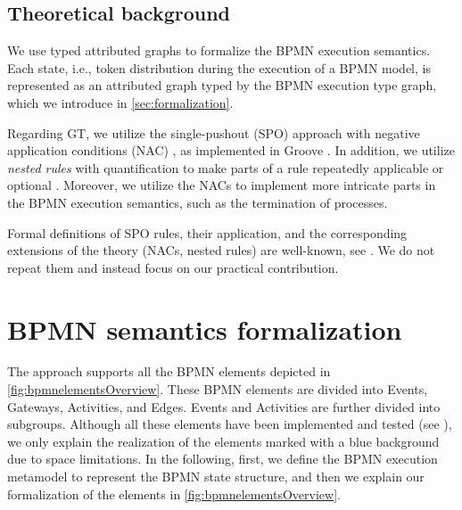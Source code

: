 \documentclass{lmcs} %
\begin{document}
\subsection{Theoretical background}
We use typed attributed graphs to formalize the BPMN execution semantics.
Each state, i.e., token distribution during the execution of a BPMN model, is represented as an attributed graph typed by the BPMN execution type graph, which we introduce in \autoref{sec:formalization}.

Regarding GT, we utilize the single-pushout (SPO) approach with negative application conditions (NAC) \cite{ehrigALGEBRAICAPPROACHESGRAPH1997}, as implemented in Groove \cite{rensinkGROOVESimulatorTool2004}.
In addition, we utilize \textit{nested rules} with quantification to make parts of a rule repeatedly applicable or optional \cite{rensinkNestedQuantificationGraph2006,rensinkHowMuchAre2017}.
Moreover, we utilize the NACs to implement more intricate parts in the BPMN execution semantics, such as the termination of processes.

Formal definitions of SPO rules, their application, and the corresponding extensions of the theory (NACs, nested rules) are well-known, see \cite{ehrigALGEBRAICAPPROACHESGRAPH1997,rensinkNestedQuantificationGraph2006}.
We do not repeat them and instead focus on our practical contribution.


\section{BPMN semantics formalization} \label{sec:formalization}

The approach supports all the BPMN elements depicted in \autoref{fig:bpmnelementsOverview}.
These BPMN elements are divided into \textsf{Events}, \textsf{Gateways}, \textsf{Activities}, and \textsf{Edges}.
\textsf{Events} and \textsf{Activities} are further divided into subgroups.
Although all these elements have been implemented and tested (see \cite{timkrauterLMCS2024Artifacts2023}), we only explain the realization of the elements marked with a blue background due to space limitations.
In the following, first, we define the BPMN execution metamodel to represent the BPMN state structure, and then we explain our formalization of the elements in \autoref{fig:bpmnelementsOverview}.
\end{document}
